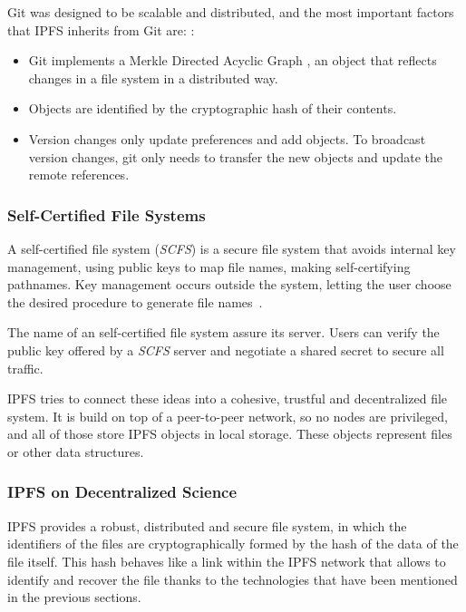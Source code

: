 Git was designed to be scalable and distributed, and the most important factors
that IPFS inherits from Git are: \cite{benet2014ipfs}:

\begin{itemize}
\item Git implements a Merkle Directed Acyclic Graph
  \cite{bleichenbacher1994directed}, an object that reflects changes in a file
  system in a distributed way.
\item Objects are identified by the cryptographic hash of their contents.
\item Version changes only update preferences and add objects. To broadcast
  version changes, git only needs to transfer the new objects and update the
  remote references.
\end{itemize}

\subsubsection*{Self-Certified File Systems}
\label{tech:sec:ipfs:scfs}

A self-certified file system (\emph{SCFS}) is a secure file system that avoids
internal key management, using public keys to map file names, making
self-certifying pathnames. Key management occurs outside the system, letting the
user choose the desired procedure to generate file
names~\cite{mazieres2000self}.

The name of an self-certified file system assure its server. Users can verify
the public key offered by a \emph{SCFS} server and negotiate a shared secret to
secure all traffic.

IPFS tries to connect these ideas into a cohesive, trustful and decentralized
file system. It is build on top of a peer-to-peer network, so no nodes are
privileged, and all of those store IPFS objects in local storage. These objects
represent files or other data structures.

\subsubsection*{IPFS on Decentralized Science}

IPFS provides a robust, distributed and secure file system, in which the
identifiers of the files are cryptographically formed by the hash of the data of
the file itself. This hash behaves like a link within the IPFS network that
allows to identify and recover the file thanks to the technologies that have
been mentioned in the previous sections.

